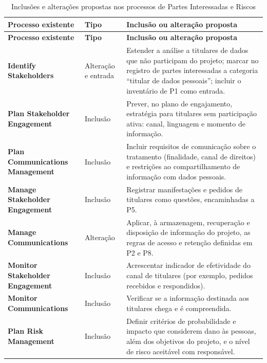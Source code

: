 \documentclass[12pt,a4paper,article,oneside,english,brazil]{abntex2}
\begin{document}
\begingroup\SingleSpacing\small
\begin{longtable}{@{}>{\raggedright\arraybackslash}p{}>{\raggedright\arraybackslash}p{}>{\raggedright\arraybackslash}p{}@{}}
\caption{Inclusões e alterações propostas nos processos de Partes Interessadas e Riscos}\label{tab:t10}\\
\hline
\textbf{Processo existente} & \textbf{Tipo} & \textbf{Inclusão ou alteração proposta}\\
\hline
\endfirsthead
\hline
\textbf{Processo existente} & \textbf{Tipo} & \textbf{Inclusão ou alteração proposta}\\
\hline
\endhead
\hline
\endfoot
\hline
\endlastfoot
\textbf{Identify Stakeholders} & Alteração e entrada & Estender a análise a titulares de dados que não participam do projeto; marcar no registro de partes interessadas a categoria \textquotedblleft{}titular de dados pessoais\textquotedblright{}; incluir o inventário de P1 como entrada.\\[3pt]
\textbf{Plan Stakeholder Engagement} & Inclusão & Prever, no plano de engajamento, estratégia para titulares sem participação ativa: canal, linguagem e momento de informação.\\[3pt]
\textbf{Plan Communications Management} & Inclusão & Incluir requisitos de comunicação sobre o tratamento (finalidade, canal de direitos) e restrições ao compartilhamento de informação com dados pessoais.\\[3pt]
\textbf{Manage Stakeholder Engagement} & Inclusão & Registrar manifestações e pedidos de titulares como questões, encaminhadas a P5.\\[3pt]
\textbf{Manage Communications} & Alteração & Aplicar, à armazenagem, recuperação e disposição de informação do projeto, as regras de acesso e retenção definidas em P2 e P8.\\[3pt]
\textbf{Monitor Stakeholder Engagement} & Inclusão & Acrescentar indicador de efetividade do canal de titulares (por exemplo, pedidos recebidos e respondidos).\\[3pt]
\textbf{Monitor Communications} & Inclusão & Verificar se a informação destinada aos titulares chega e é compreendida.\\[3pt]
\textbf{Plan Risk Management} & Inclusão & Definir critérios de probabilidade e impacto que considerem dano às pessoas, além dos objetivos do projeto, e o nível de risco aceitável com responsável.\\[3pt]

\end{longtable}
\end{document}
